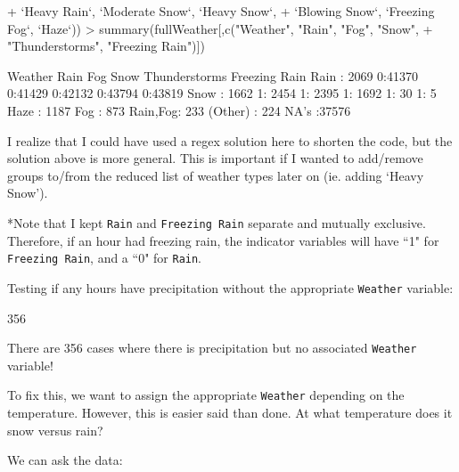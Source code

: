 \documentclass[11pt, a4paper]{article}
\begin{document}
\begin{Schunk}
\begin{Sinput}
+               `Heavy Rain`, `Moderate Snow`, `Heavy Snow`, 
+               `Blowing Snow`, `Freezing Fog`, `Haze`))
> summary(fullWeather[,c("Weather", "Rain", "Fog", "Snow", 
+                        "Thunderstorms", "Freezing Rain")])
\end{Sinput}
\begin{Soutput}
     Weather      Rain      Fog       Snow      Thunderstorms Freezing Rain
 Rain    : 2069   0:41370   0:41429   0:42132   0:43794       0:43819      
 Snow    : 1662   1: 2454   1: 2395   1: 1692   1:   30       1:    5      
 Haze    : 1187                                                            
 Fog     :  873                                                            
 Rain,Fog:  233                                                            
 (Other) :  224                                                            
 NA's    :37576                                                            
\end{Soutput}
\end{Schunk}

I realize that I could have used a regex solution here to shorten the code, but the solution above is more general. This is important if I wanted to add/remove groups to/from the reduced list of weather types later on (ie. adding `Heavy Snow').
\par
*Note that I kept \texttt{Rain} and \texttt{Freezing Rain} separate and mutually exclusive. Therefore, if an hour had freezing rain, the indicator variables will have ``1" for \texttt{Freezing Rain}, and a ``0" for \texttt{Rain}.


\pagebreak

Testing if any hours have precipitation without the appropriate \texttt{Weather} variable:

\begin{Schunk}
\begin{Soutput}
[1] 356
\end{Soutput}
\end{Schunk}

There are 356 cases where there is precipitation but no associated \texttt{Weather} variable!
\par
To fix this, we want to assign the appropriate \texttt{Weather} depending on the temperature. However, this is easier said than done. At what temperature does it snow versus rain?
\par
We can ask the data:
\end{document}
